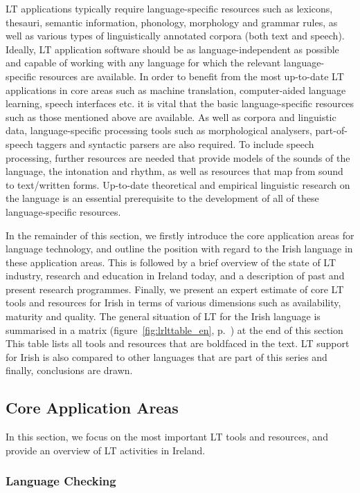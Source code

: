 \begin{multicols}{2}
LT applications typically require language-specific resources such as lexicons, thesauri, semantic information, phonology, morphology and grammar rules, as well as various types of linguistically annotated corpora (both text and speech). Ideally, LT application software should be as language-independent as possible and capable of working with any language for which the relevant language-specific resources are available. In order to benefit from the most up-to-date LT applications in core areas such as machine translation, computer-aided language learning, speech  interfaces etc. it is vital that the basic language-specific resources such as those mentioned above are available. As well as corpora and linguistic data, language-specific processing tools such as morphological analysers, part-of-speech taggers and syntactic parsers  are also required. To include speech processing, further resources are needed that provide models of the sounds of the language, the intonation and rhythm, as well as resources that map from sound to text/written forms. Up-to-date theoretical and empirical linguistic research on the language is an essential prerequisite to the development of all of these language-specific resources.

In the remainder of this section, we firstly introduce the core application areas for language technology, and outline the position with regard to the Irish language in these application areas. This is followed by a brief overview of the state of LT industry, research and education in Ireland today, and a description of past and present research programmes. Finally, we present an expert estimate of core LT tools and resources for Irish in terms of various dimensions such as availability, maturity and quality. The general situation of LT for the Irish language is summarised in a matrix (figure~\ref{fig:lrlttable_en}, p.~\pageref{fig:lrlttable_en}) at the end of this section This table lists all tools and resources that are boldfaced in the text. LT support for Irish is also compared to other languages that are part of this series and finally, conclusions are drawn.

\subsection{Core Application Areas}

In this section, we focus on the most important LT tools and resources, and provide an overview of LT activities in Ireland.

\subsubsection{Language Checking}


\end{multicols}
